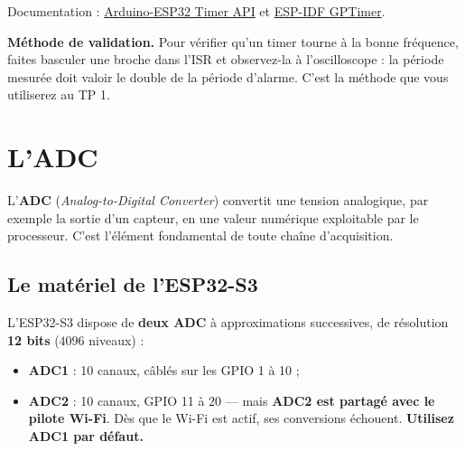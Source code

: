 
Documentation : \href{https://docs.espressif.com/projects/arduino-esp32/en/latest/api/timer.html}{Arduino-ESP32 Timer API} et \href{https://docs.espressif.com/projects/esp-idf/en/latest/esp32s3/api-reference/peripherals/gptimer.html}{ESP-IDF GPTimer}. \cite{arduino_timer,esp32s3_gptimer}

\begin{imp}
\textbf{Méthode de validation.} Pour vérifier qu'un timer tourne à la bonne fréquence, faites basculer une broche dans l'ISR et observez-la à l'oscilloscope : la période mesurée doit valoir le double de la période d'alarme. C'est la méthode que vous utiliserez au TP 1.
\end{imp}

\newpage

\section{L'ADC}

L'\textbf{ADC} (\textit{Analog-to-Digital Converter}) convertit une tension analogique, par exemple la sortie d'un capteur, en une valeur numérique exploitable par le processeur. C'est l'élément fondamental de toute chaîne d'acquisition.

\subsection{Le matériel de l'ESP32-S3}

L'ESP32-S3 dispose de \textbf{deux ADC} à approximations successives, de résolution \textbf{12 bits} ($4096$ niveaux) :

\begin{itemize}
    \item \textbf{ADC1} : 10 canaux, câblés sur les GPIO 1 à 10 ;
    \item \textbf{ADC2} : 10 canaux, GPIO 11 à 20 — mais \textbf{ADC2 est partagé avec le pilote Wi-Fi}. Dès que le Wi-Fi est actif, ses conversions échouent. \textbf{Utilisez ADC1 par défaut.}
\end{itemize}

